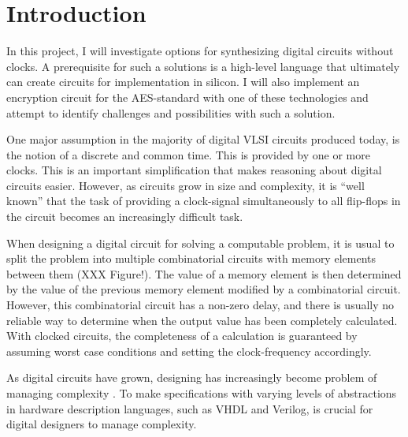 \section{Introduction}

In this project, I will investigate options for synthesizing digital
circuits without clocks. A prerequisite for such a solutions is a
high-level language that ultimately can create circuits for
implementation in silicon. I will also implement an encryption circuit
for the AES-standard with one of these technologies and attempt to
identify challenges and possibilities with such a solution.

One major assumption in the majority of digital VLSI circuits produced
today, is the notion of a discrete and common time. This is provided
by one or more clocks. This is an important simplification that makes
reasoning about digital circuits easier. However, as circuits grow in
size and complexity, it is ``well known'' \cite[pp. 5]{sparso} that
the task of providing a clock-signal simultaneously to all flip-flops
in the circuit becomes an increasingly difficult task.

When designing a digital circuit for solving a computable problem, it
is usual to split the problem into multiple combinatorial circuits
with memory elements between them (XXX Figure!). The value of a memory
element is then determined by the value of the previous memory element
modified by a combinatorial circuit. However, this combinatorial
circuit has a non-zero delay, and there is usually no reliable way to
determine when the output value has been completely calculated. With
clocked circuits, the completeness of a calculation is guaranteed by
assuming worst case conditions and setting the clock-frequency
accordingly.

As digital circuits have grown, designing has increasingly become
problem of managing complexity \cite{flynn2009deep}. To make
specifications with varying levels of abstractions in hardware
description languages, such as VHDL and Verilog, is crucial for
digital designers to manage complexity.

